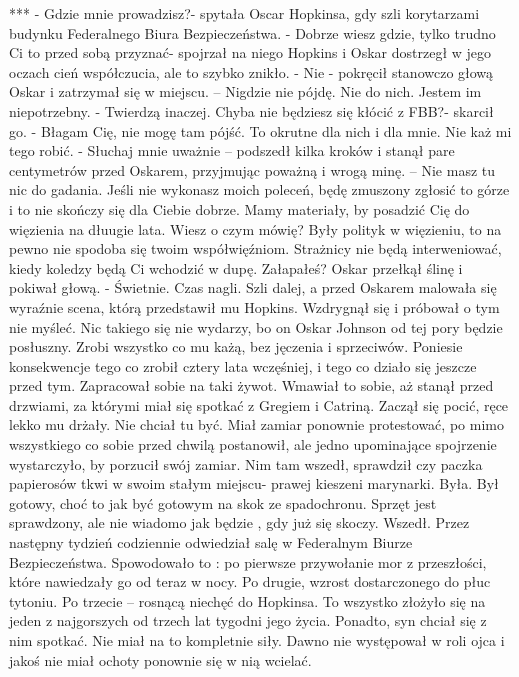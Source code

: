 \documentclass[12pt,a4paper]{book}
\begin{document}
                                ***
- Gdzie mnie prowadzisz?- spytała Oscar Hopkinsa, gdy szli korytarzami budynku Federalnego Biura Bezpieczeństwa. 
- Dobrze wiesz gdzie, tylko trudno Ci to przed sobą przyznać- spojrzał na niego Hopkins i Oskar dostrzegł w jego oczach cień współczucia, ale to szybko znikło. 
- Nie - pokręcił stanowczo głową Oskar i zatrzymał się w miejscu. – Nigdzie nie pójdę. Nie do nich. Jestem im niepotrzebny. 
- Twierdzą inaczej. Chyba nie będziesz się kłócić z FBB?- skarcił go. 
- Błagam Cię, nie mogę tam pójść. To okrutne dla nich i dla mnie. Nie każ mi tego robić. 
- Słuchaj mnie uważnie – podszedł kilka kroków i stanął pare centymetrów przed Oskarem, przyjmując poważną i wrogą minę.      – Nie masz tu nic do gadania. Jeśli nie wykonasz moich poleceń, będę zmuszony zgłosić to górze i to nie skończy się dla Ciebie dobrze. Mamy materiały, by posadzić Cię do więzienia na dłuugie lata. Wiesz o czym mówię? Były polityk w więzieniu, to na pewno nie spodoba się twoim współwięźniom. Strażnicy nie będą interweniować, kiedy koledzy będą Ci wchodzić w dupę. Załapałeś?
Oskar przełkął ślinę i pokiwał głową. 
- Świetnie. Czas nagli.
Szli dalej, a przed Oskarem malowała się wyraźnie scena, którą przedstawił mu Hopkins. Wzdrygnął się i próbował o tym nie myśleć. Nic takiego się nie wydarzy, bo on Oskar Johnson od tej pory będzie posłuszny. Zrobi wszystko co mu każą, bez jęczenia i sprzeciwów. Poniesie konsekwencje tego co zrobił cztery lata wczęśniej, i tego co działo się jeszcze przed tym. Zapracował sobie na taki żywot. Wmawiał to sobie, aż stanął przed drzwiami, za którymi miał się spotkać z Gregiem i Catriną. Zaczął się pocić, ręce lekko mu drżały. Nie chciał tu być. Miał zamiar ponownie protestować, po mimo wszystkiego co sobie przed chwilą postanowił, ale jedno upominające spojrzenie wystarczyło, by porzucił swój zamiar. Nim tam wszedł, sprawdził czy paczka papierosów tkwi w swoim stałym miejscu- prawej kieszeni marynarki. Była. Był gotowy, choć to jak być gotowym na skok ze spadochronu. Sprzęt jest sprawdzony, ale nie wiadomo jak będzie , gdy już się skoczy. 
Wszedł.
Przez następny tydzień codziennie odwiedział salę w Federalnym Biurze Bezpieczeństwa. Spowodowało to : po pierwsze przywołanie mor z przeszłości, które nawiedzały go od teraz w nocy. Po drugie, wzrost dostarczonego do płuc tytoniu. Po trzecie – rosnącą niechęć do Hopkinsa. To wszystko złożyło się na jeden z najgorszych od trzech lat tygodni jego życia. Ponadto, syn chciał się z nim spotkać. Nie miał na to kompletnie siły. Dawno nie występował w roli ojca i jakoś nie miał ochoty ponownie się w nią wcielać. 
\end{document}

